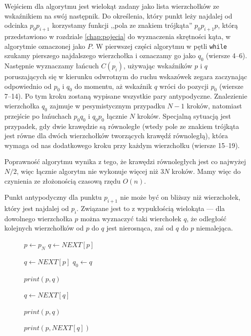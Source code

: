 Wejściem dla algorytmu jest wielokąt zadany jako lista wierzchołków ze
wskaźnikiem na swój następnik. Do określenia, który punkt leży
najdalej od odcinka $p_{0}p_{i+1}$ korzystamy funkcji ,,pola ze
znakiem trójkąta'' $p_{0}p_{i+1}p$, którą przedstawiono w
rozdziale \ref{chap:pojecia} do wyznaczenia skrętności kąta, w
algorytmie oznaczonej jako $P$. W pierwszej części algorytmu w pętli
\texttt{while} szukamy pierszego najdalszego wierzchołka i oznaczamy
go jako $q_0$ (wiersze 4--6). Następnie wyznaczamy łańcuch $C(p_i)$,
używając wskaźników $p$ i $q$ poruszających się w kierunku odwrotnym
do ruchu wskazówek zegara zaczynając odpowiednio od $p_0$ i $q_0$ do
momentu, aż wskaźnik $q$ wróci do pozycji $p_0$ (wiersze 7--14). Po
tym kroku zostaną wypisane wszystkie pary antypodyczne. Znalezienie
wierzchołka $q_0$ zajmuje w pesymistycznym przypadku $N-1$ kroków,
natomiast przejście po łańuchach $p_{0}q_{0}$ i $q_{0}p_{0}$ łącznie
$N$ kroków. Specjalną sytuacją jest przypadek, gdy dwie krawędzie są
równoległe (wtedy pole ze znakiem trójkąta jest równe dla dwóch
wierzchołków tworzących krawędź równoległą), która wymaga od nas
dodatkowego kroku przy każdym wierzchołku (wiersze 15--19).

Poprawność algorytmu wynika z tego, że krawędzi równoległych jest co
najwyżej $N/2$, więc łącznie algorytm nie wykonuje więcej niż $3N$
kroków. Mamy więc do czynienia ze złożonością czasową rzędu $O(n)$.

Punkt antypodyczny dla punktu $p_{i+1}$ nie może być on bliższy niż
wierzchołek, który jest najdalej od $p_i$. Związane jest to z
wypukłością wielokąta --- dla dowolnego wierzchołka $p$ można
wyznaczyć taki wierchołek $q$, że odległość kolejnych wierzchołków od
$p$ do $q$ jest nierosnąca, zaś od $q$ do $p$ niemalejąca.

\begin{figure}[htp]

\begin{algorithmic}[1]

\State $p \gets p_N$
\State $q \gets NEXT[p]$

    \State $q \gets NEXT[p]$
    \State $q_0 \gets q$

        \State $print (p, q)$

            \State $q \gets NEXT[q]$

                \State $print (p, q)$
            \EndIf
        \EndWhile

                \State $print (p, NEXT[q])$
            \EndIf
        \EndIf
    \EndWhile
\EndWhile
\EndProcedure

\end{algorithmic}
\caption{\label{alg:antipodal}}
\end{figure}

